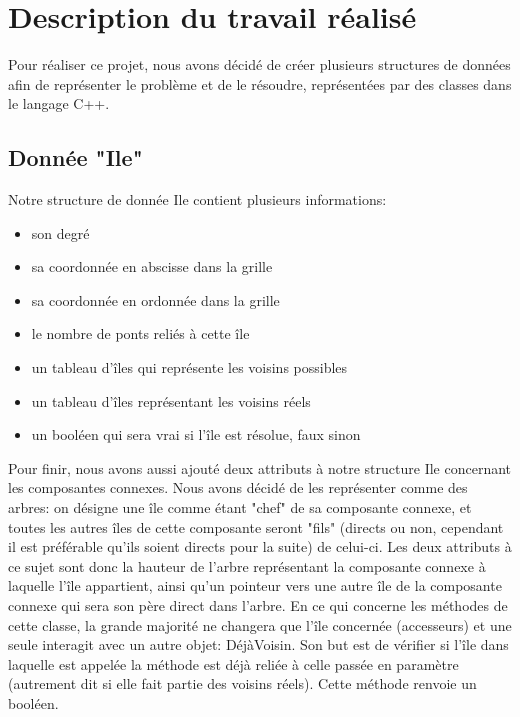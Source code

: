 \chapter{Description du travail réalisé}
\label{chap:description}

Pour réaliser ce projet, nous avons décidé de créer plusieurs structures de données afin de représenter le problème et de le résoudre, représentées par des classes dans le langage C++.

\section{Donnée "Ile"}
Notre structure de donnée Ile contient plusieurs informations:
\begin{itemize}
    \item son degré
    \item sa coordonnée en abscisse dans la grille
    \item sa coordonnée en ordonnée dans la grille
    \item le nombre de ponts reliés à cette île
    \item un tableau d'îles qui représente les voisins possibles
    \item un tableau d'îles représentant les voisins réels
    \item un booléen qui sera vrai si l'île est résolue, faux sinon
\end{itemize}
\smallbreak
Pour finir, nous avons aussi ajouté deux attributs à notre structure Ile concernant les composantes connexes. Nous avons décidé de les représenter comme des arbres: on désigne une île comme étant "chef" de sa composante connexe, et toutes les autres îles de cette composante seront "fils" (directs ou non, cependant il est préférable qu'ils soient directs pour la suite) de celui-ci. Les deux attributs à ce sujet sont donc la hauteur de l'arbre représentant la composante connexe à laquelle l'île appartient, ainsi qu'un pointeur vers une autre île de la composante connexe qui sera son père direct dans l'arbre.
\smallbreak
En ce qui concerne les méthodes de cette classe, la grande majorité ne changera que l'île concernée (accesseurs) et une seule interagit avec un autre objet: DéjàVoisin. Son but est de vérifier si l'île dans laquelle est appelée la méthode est déjà reliée à celle passée en paramètre (autrement dit si elle fait partie des voisins réels). Cette méthode renvoie un booléen.

